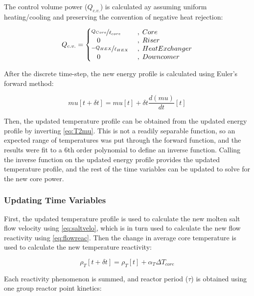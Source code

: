 The control volume power  ($Q_{c.v.}$) is calculated ay assuming uniform heating/cooling and preserving the convention of negative heat rejection:

\begin{equation}
    Q_{c.v.} = \left\{ 
        \begin{matrix*}[l]
            \nicefrac{Q_{Core}}{\ell_{core}} &\;,\; Core\\
            \;\;\;0                       &\;,\; Riser\\
            \nicefrac{-Q_{HEX}}{\ell_{HEX}}  &\;,\; Heat Exchanger\\
            \;\;\;0                       &\;,\; Downcomer
        \end{matrix*}
    \right.
\end{equation}

After the discrete time-step, the new energy profile is calculated using Euler's forward method:

\begin{equation}
    mu[t+\delta t] = mu[t] + \delta t\frac{d(mu)}{dt}[t]
\end{equation}

Then, the updated temperature profile can be obtained from the updated energy profile by inverting \ref{eq:T2mu}. This is not a readily separable function, so an expected range of temperatures was put through the forward function, and the results were fit to a 6th order polynomial to define an inverse function. Calling the inverse function on the updated energy profile provides the updated temperature profile, and the rest of the time variables can be updated to solve for the new core power.

\subsubsection{Updating Time Variables}
First, the updated temperature profile is used to calculate the new molten salt flow velocity using \ref{eq:saltvelo}, which is in turn used to calculate the new flow reactivity using \ref{eq:flowreac}. Then the change in average core temperature is used to calculate the new temperature reactivity:

\begin{equation}
    \rho_T[t+\delta t] = \rho_T[t] + \alpha_T\Delta T_{core}
\end{equation}

Each reactivity phenomenon is summed, and reactor period ($\tau$) is obtained using one group reactor point kinetics:

